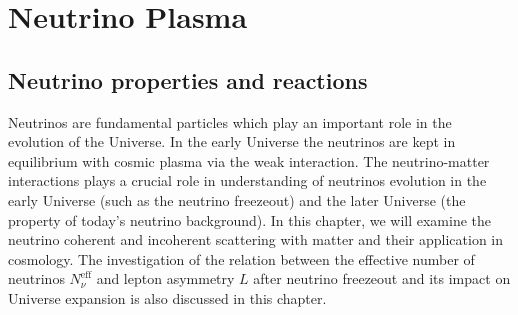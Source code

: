 \section{Neutrino Plasma}\label{Neutrino}
\subsection{Neutrino properties and reactions}\label{ssec:nuproperties}
Neutrinos are fundamental particles which play an important role in the evolution of the Universe. In the early Universe the neutrinos are kept in equilibrium with cosmic plasma via the weak interaction. The neutrino-matter interactions plays a crucial role in  understanding of neutrinos evolution in the early Universe (such as the neutrino freezeout) and the later Universe (the property of today's neutrino background). In this chapter, we will examine the neutrino coherent and incoherent scattering with matter and their application in cosmology. The investigation of the relation between the effective number of neutrinos $N^{\mathrm{eff}}_\nu$ and lepton asymmetry $L$ after neutrino freezeout and its impact on Universe expansion is also discussed in this chapter. 



